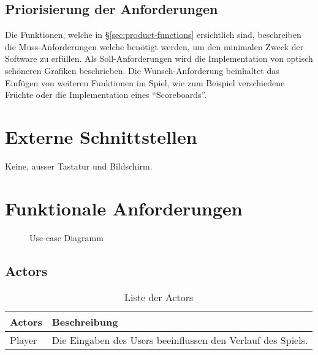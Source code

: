 \documentclass[a4paper, twosided, 11pt]{scrartcl}
\begin{document}
\subsection{Priorisierung der Anforderungen}
Die Funktionen, welche in \S\ref{sec:product-functions} ersichtlich sind,
beschreiben die Muss-Anforderungen welche benötigt werden, um den minimalen
Zweck der Software zu erfüllen. Als Soll-Anforderungen wird die Implementation
von optisch schöneren Grafiken beschrieben.  Die Wunsch-Anforderung beinhaltet
das Einfügen von weiteren Funktionen im Spiel, wie zum Beispiel verschiedene
Früchte oder die Implementation eines ``Scoreboards''.

\section{Externe Schnittstellen}
Keine, ausser Tastatur und Bildschirm.

\section{Funktionale Anforderungen}
\begin{figure}[h]
  \centering
  
  \caption{Use-case Diagramm}
\end{figure}

\subsection{Actors}
\begin{table}[H]
  \centering
  \begin{tabular}{ll}
    \toprule
    Actors & Beschreibung \\
    \midrule
    Player & Die Eingaben des Users beeinflussen den Verlauf des Spiels. \\
    \bottomrule
  \end{tabular}
  \caption{Liste der Actors}
\end{table}
\end{document}
